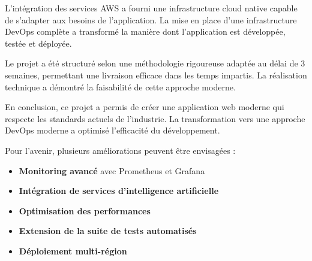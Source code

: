 \documentclass[12pt,a4paper]{report}
\begin{document}
\begin{infobox}
L'intégration des services AWS a fourni une infrastructure cloud native capable de s'adapter aux besoins de l'application. La mise en place d'une infrastructure DevOps complète a transformé la manière dont l'application est développée, testée et déployée.
\end{infobox}

Le projet a été structuré selon une méthodologie rigoureuse adaptée au délai de 3 semaines, permettant une livraison efficace dans les temps impartis. La réalisation technique a démontré la faisabilité de cette approche moderne.

En conclusion, ce projet a permis de créer une application web moderne qui respecte les standards actuels de l'industrie. La transformation vers une approche DevOps moderne a optimisé l'efficacité du développement.

\begin{tcolorbox}[colback=accentgreen!10, colframe=accentgreen, title=\textcolor{white}{\faLightbulb\ Perspectives}, fonttitle=\bfseries]
Pour l'avenir, plusieurs améliorations peuvent être envisagées :
\begin{itemize}
    \item \textcolor{primaryblue}{\textbf{Monitoring avancé}} avec Prometheus et Grafana
    \item \textcolor{primaryblue}{\textbf{Intégration de services d'intelligence artificielle}}
    \item \textcolor{primaryblue}{\textbf{Optimisation des performances}}
    \item \textcolor{primaryblue}{\textbf{Extension de la suite de tests automatisés}}
    \item \textcolor{primaryblue}{\textbf{Déploiement multi-région}}
\end{itemize}
\end{tcolorbox}
\end{document}
